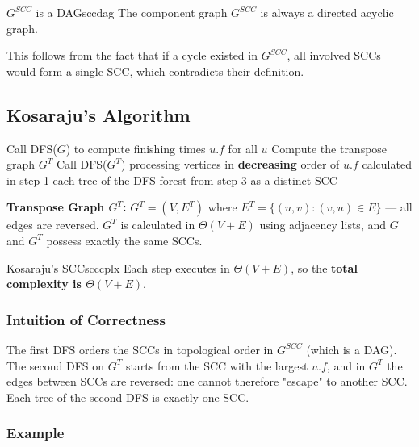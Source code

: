 \begin{theorem}{$G^{SCC}$ is a DAG}{sccdag}
The component graph $G^{SCC}$ is always a directed acyclic graph.
\end{theorem}

This follows from the fact that if a cycle existed in $G^{SCC}$, all involved SCCs
would form a single SCC, which contradicts their definition.

\subsection{Kosaraju's Algorithm}

\begin{algorithm}[H]
\caption{SCC($G$)}
\begin{algorithmic}[1]
\State Call \textsc{DFS}($G$) to compute finishing times $u.f$ for all $u$
\State Compute the transpose graph $G^T$   
\State Call \textsc{DFS}($G^T$) processing vertices in
       \textbf{decreasing} order of $u.f$ calculated in step 1
\State \Return each tree of the DFS forest from step 3 as a distinct SCC
\end{algorithmic}
\end{algorithm}

\textbf{Transpose Graph $G^T$:}
$G^T = (V, E^T)$ where $E^T = \{(u,v) : (v,u) \in E\}$ — all edges are
reversed. $G^T$ is calculated in $\Theta(V + E)$ using adjacency lists, and
$G$ and $G^T$ possess exactly the same SCCs.

\begin{complexity}{Kosaraju's SCC}{scccplx}
Each step executes in $\Theta(V + E)$, so the
\textbf{total complexity is $\Theta(V + E)$}.
\end{complexity}

\subsubsection{Intuition of Correctness}

The first DFS orders the SCCs in topological order in $G^{SCC}$ (which is a DAG).
The second DFS on $G^T$ starts from the SCC with the largest $u.f$, and in $G^T$ the
edges between SCCs are reversed: one cannot therefore "escape" to another
SCC. Each tree of the second DFS is exactly one SCC.

\subsubsection{Example}

